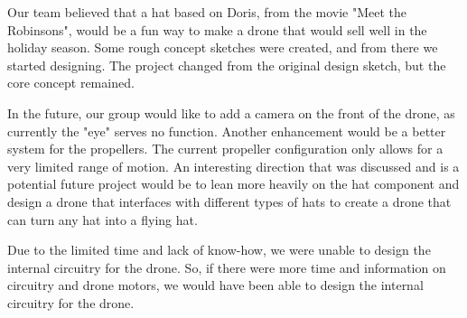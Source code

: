 
Our team believed that a hat based on Doris, from the movie "Meet the Robinsons", would be a fun way to make a drone that would sell well in the holiday season. Some rough concept sketches were created, and from there we started designing. The project changed from the original design sketch, but the core concept remained. \par

In the future, our group would like to add a camera on the front of the drone, as currently the "eye" serves no function. Another enhancement would be a better system for the propellers. The current propeller configuration only allows for a very limited range of motion. An interesting direction that was discussed and is a potential future project would be to lean more heavily on the hat component and design a drone that interfaces with different types of hats to create a drone that can turn any hat into a flying hat. \par

Due to the limited time and lack of know-how, we were unable to design the internal circuitry for the drone. So, if there were more time and information on circuitry and drone motors, we would have been able to design the internal circuitry for the drone. \par